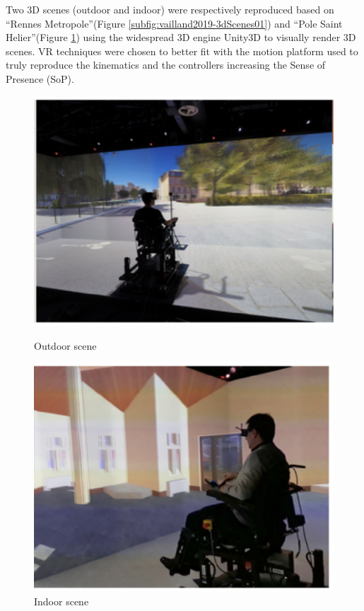Two  3D scenes (outdoor and indoor) were respectively reproduced based on ``Rennes Metropole''(Figure \ref{subfig:vailland2019-3dScenes01}) and ``Pole Saint Helier''(Figure \ref{subfig:vailland2019-3dScenes02}) using the widespread 3D engine Unity3D to visually render 3D scenes. VR techniques were chosen to better fit with the motion platform used to truly reproduce the kinematics and the controllers increasing the Sense of Presence (SoP). 

\begin{figure}[!h]
\center
\begin{minipage}{0.495\linewidth}
\center
\captionsetup{justification=centering,margin=0.5cm,font=small}
\includegraphics[width=0.95\linewidth]{img/cap3/vailland2019-3dScenes01}
\caption{ Outdoor scene \cite{vailland2019}} \label{subfig:vailland2019-3dScenes01}
\end{minipage}
\begin{minipage}{0.495\linewidth}
\center
\captionsetup{justification=centering,margin=0cm,font=small}
\includegraphics[width=0.95\linewidth]{img/cap3/vailland2019-3dScenes02}
\caption{ Indoor scene \cite{vailland2019}} \label{subfig:vailland2019-3dScenes02}
\end{minipage}
\end{figure}

